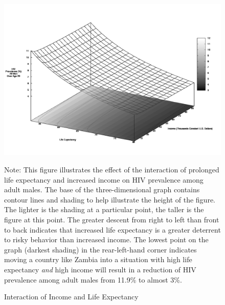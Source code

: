 \documentclass[12pt]{article}
\begin{document}
\begin{figure}
\begin{center}
\caption{Interaction of Income and Life Expectancy}\label{fg:incomelife}
\includegraphics[scale=0.33]{images/hiv_gdplife.png}\\
\parbox{5.5in}{\footnotesize{Note: This figure illustrates the effect of the interaction of prolonged life expectancy and increased income on HIV prevalence among adult males.  The base of the three-dimensional graph contains contour lines and shading to help illustrate the height of the figure.  The lighter is the shading at a particular point, the taller is the figure at this point.  The greater descent from right to left than front to back indicates that increased life expectancy is a greater deterrent to risky behavior than increased income.  The lowest point on the graph (darkest shading) in the rear-left-hand corner indicates moving a country like Zambia into a situation with high life expectancy \textit{and} high income will result in a reduction of HIV prevalence among adult males from 11.9\% to almost 3\%.}}
\end{center}
\end{figure}
\end{document}
